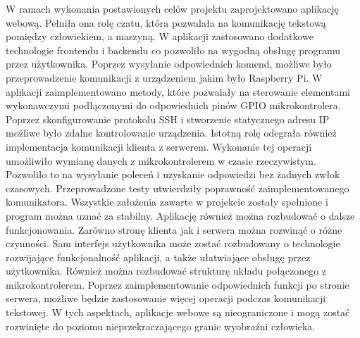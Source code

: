 
W ramach wykonania postawionych celów projektu zaprojektowano aplikację webową. Pełniła ona rolę czatu, która pozwalała na komunikację tekstową pomiędzy człowiekiem, a maszyną. W aplikacji zastosowano dodatkowe technologie frontendu i backendu co pozwoliło na wygodną obsługę programu przez użytkownika. Poprzez wysyłanie odpowiednich komend, możliwe było przeprowadzenie komunikacji z urządzeniem jakim było Raspberry Pi. W aplikacji zaimplementowano metody, które pozwalały na sterowanie elementami wykonawczymi podłączonymi do odpowiednich pinów GPIO mikrokontrolera. Poprzez skonfigurowanie protokołu SSH i stworzenie statycznego adresu IP możliwe było zdalne kontrolowanie urządzenia. Istotną rolę odegrała również implementacja komunikacji klienta z serwerem. Wykonanie tej operacji umożliwiło wymianę danych z mikrokontrolerem w czasie rzeczywistym. Pozwoliło to na wysyłanie poleceń i uzyskanie odpowiedzi bez żadnych zwłok czasowych. Przeprowadzone testy utwierdziły poprawność zaimplementowanego komunikatora. Wszystkie założenia zawarte w projekcie zostały spełnione i program można uznać za stabilny. Aplikację również można rozbudować o dalsze funkcjonowania. Zarówno stronę klienta jak i serwera można rozwinąć o różne czynności. Sam interfejs użytkownika może zostać rozbudowany o technologie rozwijające funkcjonalność aplikacji, a także ułatwiające obsługę przez użytkownika. Również można rozbudować strukturę układu połączonego z mikrokontrolerem. Poprzez zaimplementowanie odpowiednich funkcji po stronie serwera, możliwe będzie zastosowanie więcej operacji podczas komunikacji tekstowej. W tych aspektach, aplikacje webowe są nieograniczone i mogą zostać rozwinięte do poziomu nieprzekraczającego granic wyobraźni człowieka.